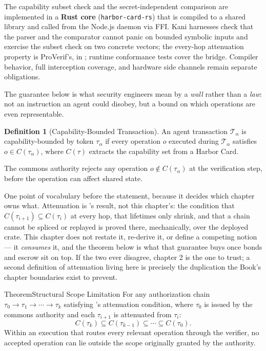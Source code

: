 \documentclass[11pt,a4paper]{article}
\theoremstyle{definition}
\newtheorem{definition}{Definition}[section]
\theoremstyle{remark}
\begin{document}
The capability subset check and the secret-independent comparison are implemented in a \textbf{Rust core} (\texttt{harbor-card-rs}) that is compiled to a shared library and called from the Node.js daemon via FFI. Kani harnesses check that the parser and the comparator cannot panic on bounded symbolic inputs and exercise the subset check on two concrete vectors; the every-hop attenuation property is ProVerif's, in ; runtime conformance tests cover the bridge. Compiler behavior, full interception coverage, and hardware side channels remain separate obligations.

The guarantee below is what security engineers mean by a \emph{wall} rather than a \emph{law}: not an instruction an agent could disobey, but a bound on which operations are even representable.

\begin{definition}[Capability-Bounded Transaction]\label{def:cap-txn}
\setlength{\parskip}{4pt plus 1pt}
An agent transaction $\mathcal{T}_\alpha$ is capability-bounded by token $\tau_\alpha$ if every operation $o$ executed during $\mathcal{T}_\alpha$ satisfies $o \in C(\tau_\alpha)$, where $C(\tau)$ extracts the capability set from a Harbor Card. 

The commons authority rejects any operation $o \notin C(\tau_\alpha)$ at the verification step, before the operation can affect shared state.
\end{definition}

One point of vocabulary before the statement, because it decides which chapter
owns what. Attenuation is 's result, not
this chapter's: the condition that $C(\tau_{i+1}) \subseteq C(\tau_i)$ at every
hop, that lifetimes only shrink, and that a chain cannot be spliced or replayed
is proved there, mechanically, over the deployed crate. This chapter does not
restate it, re-derive it, or define a competing notion --- it \emph{consumes}
it, and the theorem below is what that guarantee buys once bonds and escrow sit
on top. If the two ever disagree, chapter 2 is the one to trust; a second
definition of attenuation living here is precisely the duplication the Book's
chapter boundaries exist to prevent.

\begin{pdclaim}{Theorem}{Structural Scope Limitation}
\setlength{\parskip}{4pt plus 1pt}
\label{thm:scope}
For any authorization chain $\tau_0 \rightarrow \tau_1 \rightarrow \cdots \rightarrow \tau_k$ satisfying 's attenuation condition, where $\tau_0$ is issued by the commons authority and each $\tau_{i+1}$ is attenuated from $\tau_i$:
\[
C(\tau_k) \subseteq C(\tau_{k-1}) \subseteq \cdots \subseteq C(\tau_0).
\]
Within an execution that routes every relevant operation through the verifier, no
accepted operation can lie outside the scope originally granted by the authority.
\end{pdclaim}
\end{document}
